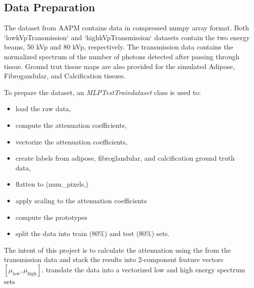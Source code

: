 \subsection{Data Preparation}\label{sec:data_preparation}

The dataset from AAPM \cite{AAPM2024SpectralCT} contains data in compressed numpy array format. Both
`lowkVpTransmission` and `highkVpTransmission` datasets contain the two energy beams, 50 kVp and 80
kVp, respectively. The transmission data contains the normalized spectrum of the number of photons
detected after passing through tissue. Ground trut tissue maps are also provided for the simulated
Adipose, Fibrogandular, and Calcification tissues.

To prepare the dataset, an \emph{MLPTestTraindataset} class is used to:

\begin{itemize}
    \item load the raw data,
    \item compute the attenuation coefficients,
    \item vectorize the attenuation coefficients,
    \item create labels from adipose, fibroglandular, and calcification ground truth data,
    \item flatten to (num\_pixels,)
    \item apply scaling to the attenuation coefficients
    \item compute the prototypes
    \item split the data into train (80\%) and test (80\%) sets.
\end{itemize}

The intent of this project is to calculate the attenuation using the from the transmission data and stack the results
into 2-component feature vectors $[\mu_{\text{low}}, \mu_{\text{high}}]$.
translate the data into a vectorized low and high energy spectrum sets

